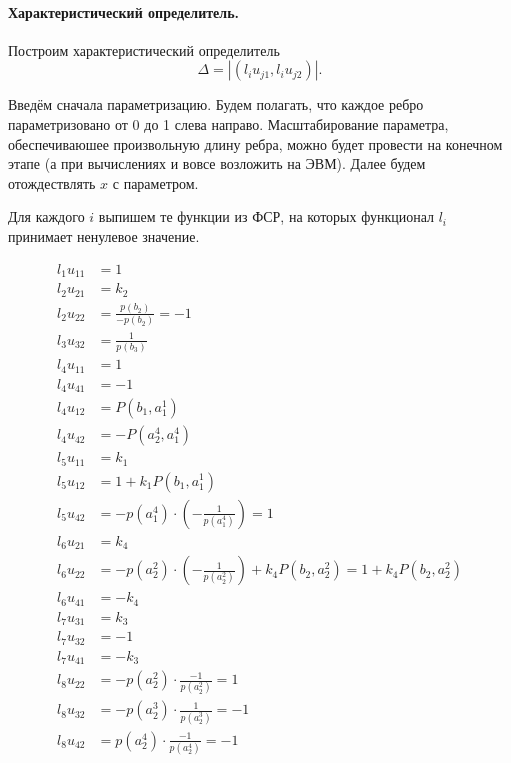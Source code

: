 \documentclass[a4paper,12pt]{article} %
\begin{document}
\paragraph{Характеристический определитель.}
Построим характеристический определитель
\begin{equation}
	\Delta = | (l_i u_{j1}, l_i u_{j2})|.
\end{equation}

Введём сначала параметризацию.
Будем полагать, что каждое ребро параметризовано от 0 до 1 слева направо.
Масштабирование параметра, обеспечиваюшее произвольную длину ребра,
можно будет провести на конечном этапе
(а при вычислениях и вовсе возложить на ЭВМ).
Далее будем отождествлять $x$ с параметром.

Для каждого $i$ выпишем те функции из ФСР, на которых функционал $l_i$
принимает ненулевое значение.

\begin{align}
	l_1u_{11} & = 1
	\\
	l_2u_{21} & = k_2
	\\
	l_2u_{22} & = \frac{p(b_2)}{-p(b_2)} = -1
	\\
	l_3u_{32} & = \frac{1}{p(b_3)}
	\\
	l_4u_{11} & = 1
	\\
	l_4u_{41} & = -1
	\\
	l_4u_{12} & = P(b_1, a_1^1)
	\\
	l_4u_{42} & = - P(a_2^4, a_1^4)
	\\
	l_5u_{11} & = k_1
	\\
	l_5u_{12} & = 1 + k_1  P(b_1, a_1^1)
	\\
	l_5u_{42} & = - p(a_1^4) \cdot \left(-\frac{1}{p(a_1^4)}\right) = 1
	\\
	l_6u_{21} & = k_4
	\\
	l_6u_{22} & = - p(a_2^2) \cdot \left(-\frac{1}{p(a_2^2)}\right) + k_4 P(b_2, a_2^2) = 1 + k_4 P(b_2, a_2^2)
	\\
	l_6u_{41} & = - k_4
	\\
	l_7u_{31} & = k_3
	\\
	l_7u_{32} & = - 1
	\\
	l_7u_{41} & = - k_3
	\\
	l_8u_{22} & = - p(a_2^2) \cdot \frac{-1}{p(a_2^2)} =  1
	\\
	l_8u_{32} & = - p(a_2^3) \cdot \frac{ 1}{p(a_2^3)} = -1
	\\
	l_8u_{42} & =   p(a_2^4) \cdot \frac{-1}{p(a_2^4)} = -1
\end{align}
\end{document}
